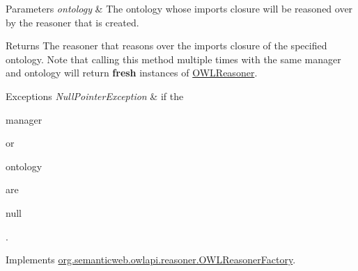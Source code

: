 \begin{DoxyParams}{Parameters}
{\em ontology} & The ontology whose imports closure will be reasoned over by the reasoner that is created. \\
\hline
\end{DoxyParams}
\begin{DoxyReturn}{Returns}
The reasoner that reasons over the imports closure of the specified ontology. Note that calling this method multiple times with the same manager and ontology will return {\bfseries fresh} instances of \hyperlink{interfaceorg_1_1semanticweb_1_1owlapi_1_1reasoner_1_1_o_w_l_reasoner}{O\-W\-L\-Reasoner}. 
\end{DoxyReturn}

\begin{DoxyExceptions}{Exceptions}
{\em Null\-Pointer\-Exception} & if the
\begin{DoxyCode}
manager 
\end{DoxyCode}
 or
\begin{DoxyCode}
ontology 
\end{DoxyCode}
 are
\begin{DoxyCode}
null 
\end{DoxyCode}
 . \\
\hline
\end{DoxyExceptions}


Implements \hyperlink{interfaceorg_1_1semanticweb_1_1owlapi_1_1reasoner_1_1_o_w_l_reasoner_factory_a2b119c65105b4b219b8d7920a17a0f7b}{org.\-semanticweb.\-owlapi.\-reasoner.\-O\-W\-L\-Reasoner\-Factory}.

